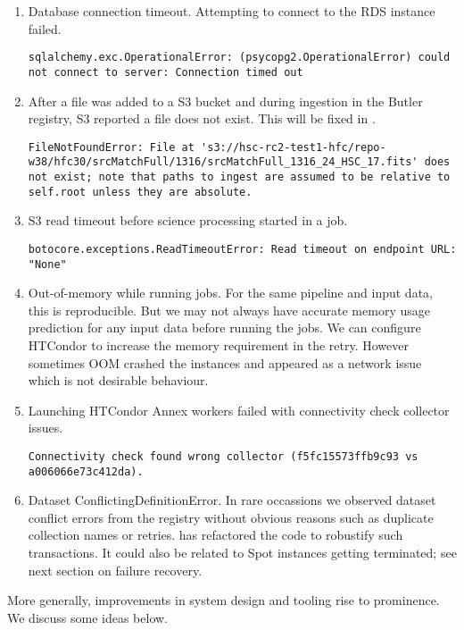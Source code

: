 \begin{enumerate}
\item Database connection timeout. Attempting to connect to the RDS instance failed.
\begin{lstlisting}[style=basherror]
sqlalchemy.exc.OperationalError: (psycopg2.OperationalError) could not connect to server: Connection timed out
\end{lstlisting}
\item
After a file was added to a S3 bucket and during ingestion in the Butler registry, S3 reported a file does not exist.
This will be fixed in .
\begin{lstlisting}[style=basherror]
FileNotFoundError: File at 's3://hsc-rc2-test1-hfc/repo-w38/hfc30/srcMatchFull/1316/srcMatchFull_1316_24_HSC_17.fits' does not exist; note that paths to ingest are assumed to be relative to self.root unless they are absolute.
\end{lstlisting}
\item S3 read timeout before science processing started in a job.
\begin{lstlisting}[style=basherror]
botocore.exceptions.ReadTimeoutError: Read timeout on endpoint URL: "None"
\end{lstlisting}
\item Out-of-memory while running jobs.
For the same pipeline and input data, this is reproducible.
But we may not always have accurate memory usage prediction for any input data before running the jobs.
We can configure HTCondor to increase the memory requirement in the retry.
However sometimes OOM crashed the instances and appeared as a network issue which is not  desirable behaviour.
\item Launching HTCondor Annex workers failed with connectivity check collector issues.
\begin{lstlisting}[style=basherror]
Connectivity check found wrong collector (f5fc15573ffb9c93 vs a006066e73c412da).
\end{lstlisting}
\item Dataset ConflictingDefinitionError.
In rare occassions we observed dataset conflict errors from the registry without obvious reasons such as duplicate collection names or retries.
 has refactored the code to robustify such transactions.
It could also be related to Spot instances getting terminated;
see next section on failure recovery.
\end{enumerate}


More generally, improvements in system design and tooling rise to prominence.
We discuss some ideas below.

